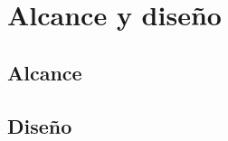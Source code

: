 \chapter{Alcance y diseño}
\label{ch:chap03}

\section{Alcance}
\label{sec:alcance}

\section{Diseño}
\label{sec:disenio}
